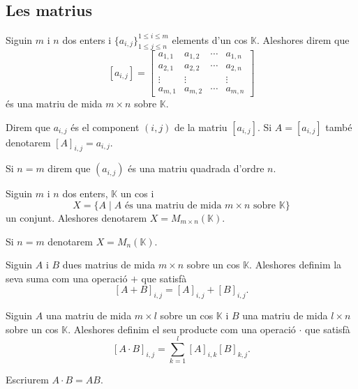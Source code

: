 \documentclass[../Apunts.tex]{subfiles}
\begin{document}
	\subsection{Les matrius}
	\begin{definition}[Matriu]
		\label{def:matriu}
		\label{def:matriu quadrada}
		Siguin \(m\) i \(n\) dos enters i \(\{a_{i,j}\}^{1\leq i\leq m}_{1\leq j\leq n}\) elements d'un cos \(\mathbb{K}\). Aleshores direm que
		\[[a_{i,j}]=
		\left[\begin{matrix}
		a_{1,1} & a_{1,2} & \cdots & a_{1,n} \\
		a_{2,1} & a_{2,2} & \cdots & a_{2,n} \\
		\vdots & \vdots &  & \vdots \\
		a_{m,1} & a_{m,2} & \cdots & a_{m,n}
		\end{matrix}\right]\]
		és una matriu de mida \(m\times n\) sobre \(\mathbb{K}\).
		
		Direm que \(a_{i,j}\) és el component \((i,j)\) de la matriu \([a_{i,j}]\). Si \(A=[a_{i,j}]\) també denotarem \([A]_{i,j}=a_{i,j}\).
		
		Si \(n=m\) direm que \((a_{i,j})\) és una matriu quadrada d'ordre \(n\).
	\end{definition}
	\begin{notation}
		\label{notation:conjunt de matrius}
		Siguin \(m\) i \(n\) dos enters, \(\mathbb{K}\) un cos i
		\[X=\{A\mid A\text{ és una matriu de mida }m\times n\text{ sobre }\mathbb{K}\}\]
		un conjunt. Aleshores denotarem \(X=M_{m\times n}(\mathbb{K})\).
		
		Si \(n=m\) denotarem \(X=M_{n}(\mathbb{K})\).
	\end{notation}
	\begin{definition}
		\label{def:suma de matrius}
		Siguin \(A\) i \(B\) dues matrius de mida \(m\times n\) sobre un cos \(\mathbb{K}\). Aleshores definim la seva suma com una operació \(+\) que satisfà
		\[[A+B]_{i,j}=[A]_{i,j}+[B]_{i,j}.\]
	\end{definition}
	\begin{definition}
		\label{def:producte de matrius}
		Siguin \(A\) una matriu de mida \(m\times l\) sobre un cos \(\mathbb{K}\) i \(B\) una matriu de mida \(l\times n\) sobre un cos \(\mathbb{K}\). Aleshores definim el seu producte com una operació \(\cdot\) que satisfà
		\[[A\cdot B]_{i,j}=\sum_{k=1}^{l}[A]_{i,k}[B]_{k,j}.\]
		
		Escriurem \(A\cdot B=AB\).
	\end{definition}
\end{document}

